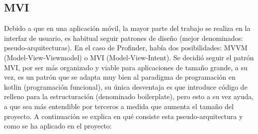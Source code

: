\hypertarget{subsec:mvi}{}
\subsection{MVI}
\label{subsec:mvi}
Debido a que en una aplicación móvil, la mayor parte del trabajo se realiza en la interfaz de usuario, es habitual seguir patrones de diseño (mejor denominados: pseudo-arquitecturas). En el caso de Profinder, había dos posibilidades: MVVM\hyperlink{cap:biblio}{} (Model-View-Viewmodel) o MVI (Model-View-Intent). Se decidió seguir el patrón MVI, por ser más organizado y viable para aplicaciones de tamaño grande, a su vez, es un patrón que se adapta muy bien al paradigma de programación en kotlin (programación funcional), su única desventaja es que introduce código de relleno para la estructuración (denominado boilerplate), pero esto a su vez ayuda, a que sea más entendible por terceros a medida que aumenta el tamaño del proyecto. A continuación se explica en qué consiste esta pseudo-arquitectura y como se ha aplicado en el proyecto:
